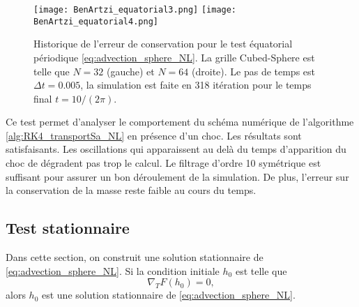 \begin{figure}[htbp]
\begin{center}
\texttt{[image: BenArtzi\_equatorial3.png]}
\texttt{[image: BenArtzi\_equatorial4.png]}
\end{center}
\caption{Historique de l'erreur de conservation pour le test équatorial périodique \eqref{eq:advection_sphere_NL}. La grille Cubed-Sphere est telle que $N=32$ (gauche) et $N=64$ (droite). Le pas de temps est $\Delta t = 0.005$, la simulation est faite en 318 itération pour le temps final $t=10/(2\pi)$.}
\label{fig:BenArtzi_equatorial3}
\end{figure} 

Ce test permet d'analyser le comportement du schéma numérique de l'algorithme \ref{alg:RK4_transportSa_NL} en présence d'un choc. Les résultats sont satisfaisants. Les oscillations qui apparaissent au delà du temps d'apparition du choc de dégradent pas trop le calcul. Le filtrage d'ordre 10 symétrique est suffisant pour assurer un bon déroulement de la simulation. De plus, l'erreur sur la conservation de la masse reste faible au cours du temps.





















\subsection{Test stationnaire}

Dans cette section, on construit une solution stationnaire de \eqref{eq:advection_sphere_NL}. Si la condition initiale $h_0$ est telle que
\begin{equation}
\nabla_T F(h_0) = 0,
\end{equation}
alors $h_0$ est une solution stationnaire de \eqref{eq:advection_sphere_NL}.

